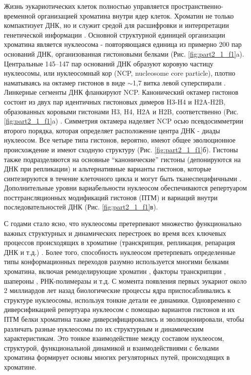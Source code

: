     Жизнь эукариотических клеток полностью управляется пространственно-временной организацией хроматина внутри ядер клеток. Хроматин не только компактизует ДНК, но и служит средой для расшифровки и интерпретации генетической информации \cite{van_holde_chromatin_1989}. Основной структурной единицей организации хроматина является нуклеосома - повторяющаяся единица из примерно 200 пар оснований ДНК, организованная гистоновыми белками \cite{olins_spheroid_1974,kornberg_chromatin_1974-1} (Рис. \ref{fig:part2_1_f1}a). Центральные 145–147 пар оснований ДНК образуют коровую частицу нуклеосомы, или нуклеосомный кор (NCP, nucleosome core particle), плотно наматываясь на октамер гистонов в виде $\sim$1,7 витка левой суперспирали \cite{luger_crystal_1997,tan_nucleosome_2011}. Линкерные сегменты ДНК фланкируют NCP. Канонический октамер гистонов состоит из двух пар идентичных гистоновых димеров H3-H4 и H2A-H2B, образованных коровыми гистонами H3, H4, H2A и H2B, соответственно (Рис. \ref{fig:part2_1_f1}a) \cite{draizen_histonedb_2016}. Симметрия октамера наделяет NCP осью псевдосимметрии второго порядка, которая определяет расположение центра ДНК - диады нуклеосом. Все четыре типа гистонов, вероятно, имеют общее эволюционное происхождение и имеют сходную структуру  \cite{malik_phylogenomics_2003,bhattacharyya_archaeal_2018} (Рис. \ref{fig:part2_1_f1}б). Гистоны также подразделяются на основные ``канонические'' гистоны (депонируются на ДНК при репликации) и альтернативные варианты гистонов, которые синтезируются в течение клеточного цикла и могут быть тканеспецифичными \cite{draizen_histonedb_2016}. Дополнительные уровни вариабельности нуклеосом обеспечиваются репертуаром посттрансляционных модификаций гистонов (ПТМ) \cite{bowman_post-translational_2015} и вариаций внутри последовательностей ДНК (Рис. \ref{fig:part2_1_f1}в).

С годами стало ясно, что нуклеосомы претерпевают множество функционально важных структурных и динамических перестроек во время всех ключевых процессов происходящих в хроматине (транскрипция, репликация, репарация ДНК и т.д.) \cite{zlatanova_nucleosome_2009,chen_asymmetric_2017}. Более того, способность нуклеосом претерпевать определенные типы конформационных переходов разумно используется многими белками хроматина, включая ремоделирующие хроматин \cite{sinha_distortion_2017,liu_mechanism_2017,ranjan_h2a_2015-1}, факторы транскрипции \cite{laptenko_p53_2011,zaret_pioneer_2016}, шапероны \cite{valieva_large-scale_2016}, РНК-полимеразы \cite{gaykalova_structural_2015} и т.д. С момента появления первых эукариот около 2 миллиардов лет назад биологические процессы ядра приспосабливались к структуре нуклеосомы, используя тонкие детали ее динамики. Одновременно с диверсификацией репертуара нуклеосом с помощью вариантов гистонов и их ПТМ белки хроматина также диверсифицировались и эволюционировали, чтобы различать разные нуклеосомы по их структурным и динамическим характеристикам. Это тонкое взаимодействие между составом нуклеосом, структурой, функциональной динамикой и взаимодействиями с белками хроматина формирует основы многих регуляторных путей, происходящих в хроматине.

